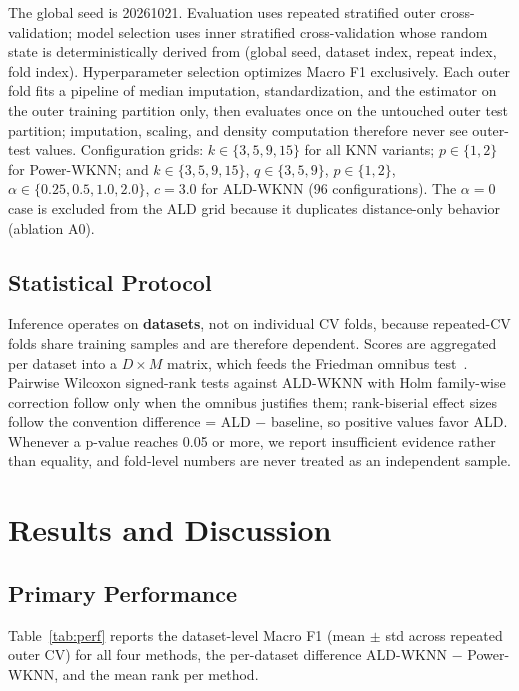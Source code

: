 \documentclass[conference]{IEEEtran}
\begin{document}
The global seed is 20261021. Evaluation uses repeated stratified outer cross-validation; model selection uses inner stratified cross-validation whose random state is deterministically derived from (global seed, dataset index, repeat index, fold index). Hyperparameter selection optimizes Macro F1 exclusively. Each outer fold fits a pipeline of median imputation, standardization, and the estimator on the outer training partition only, then evaluates once on the untouched outer test partition; imputation, scaling, and density computation therefore never see outer-test values. Configuration grids: $k \in \{3, 5, 9, 15\}$ for all KNN variants; $p \in \{1, 2\}$ for Power-WKNN; and $k \in \{3, 5, 9, 15\}$, $q \in \{3, 5, 9\}$, $p \in \{1, 2\}$, $\alpha \in \{0.25, 0.5, 1.0, 2.0\}$, $c = 3.0$ for ALD-WKNN (96 configurations). The $\alpha = 0$ case is excluded from the ALD grid because it duplicates distance-only behavior (ablation A0).

\subsection{Statistical Protocol}

Inference operates on \textbf{datasets}, not on individual CV folds, because repeated-CV folds share training samples and are therefore dependent. Scores are aggregated per dataset into a $D \times M$ matrix, which feeds the Friedman omnibus test~\cite{garcia2010,eisinga2017}. Pairwise Wilcoxon signed-rank tests against ALD-WKNN with Holm family-wise correction follow only when the omnibus justifies them; rank-biserial effect sizes follow the convention difference = ALD $-$ baseline, so positive values favor ALD. Whenever a p-value reaches 0.05 or more, we report insufficient evidence rather than equality, and fold-level numbers are never treated as an independent sample.

\section{Results and Discussion}

\subsection{Primary Performance}

Table~\ref{tab:perf} reports the dataset-level Macro F1 (mean $\pm$ std across repeated outer CV) for all four methods, the per-dataset difference ALD-WKNN $-$ Power-WKNN, and the mean rank per method.
\end{document}
